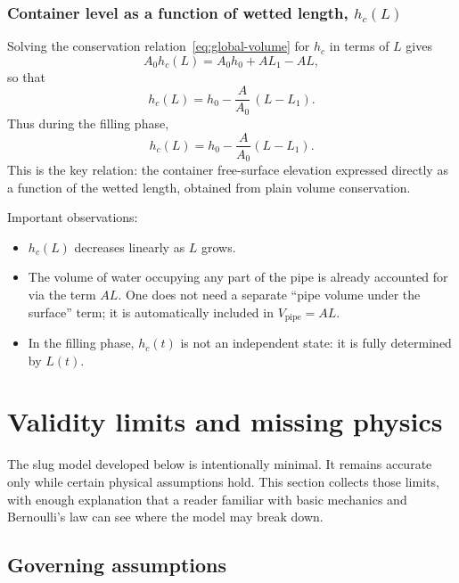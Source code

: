 \documentclass[11pt]{article}
\begin{document}
\subsubsection{Container level as a function of wetted length, $h_c(L)$}

Solving the conservation relation~\eqref{eq:global-volume} for $h_c$ in terms of $L$ gives
\[
  A_0 h_c(L) = A_0 h_0 + A L_1 - A L,
\]
so that
\[
  h_c(L) = h_0 - \frac{A}{A_0}\,(L - L_1).
\]
Thus during the filling phase,
\begin{equation}
  h_c(L) = h_0 - \frac{A}{A_0}(L - L_1).
  \label{eq:hc-of-L}
\end{equation}
This is the key relation: the container free-surface elevation expressed directly as a function
of the wetted length, obtained from plain volume conservation.

Important observations:
\begin{itemize}
  \item $h_c(L)$ decreases linearly as $L$ grows.
  \item The volume of water occupying any part of the pipe is already accounted for via the
        term $A L$. One does not need a separate ``pipe volume under the surface'' term;
        it is automatically included in $V_{\text{pipe}} = A L$.
  \item In the filling phase, $h_c(t)$ is not an independent state: it is fully determined by
        $L(t)$.
\end{itemize}

\section{Validity limits and missing physics}
\label{sec:limits}
The slug model developed below is intentionally minimal. It remains accurate only while
certain physical assumptions hold. This section collects those limits, with enough
explanation that a reader familiar with basic mechanics and Bernoulli's law can see where
the model may break down.

\subsection{Governing assumptions}
\end{document}
